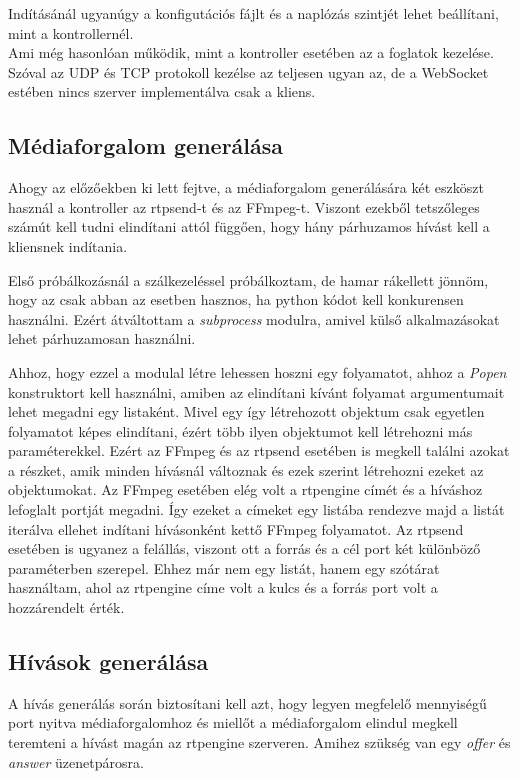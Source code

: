 Indításánál ugyanúgy a konfigutációs fájlt és a naplózás szintjét lehet beállítani,
mint a kontrollernél. \\

Ami még hasonlóan működik, mint a kontroller esetében az a foglatok kezelése.
Szóval az UDP és TCP protokoll kezélse az teljesen ugyan az, de a WebSocket estében
nincs szerver implementálva csak a kliens. 

\subsection{Médiaforgalom generálása}

Ahogy az előzőekben ki lett fejtve, a médiaforgalom generálására két eszköszt 
használ a kontroller az rtpsend-t és az FFmpeg-t. Viszont ezekből tetszőleges
számút kell tudni elindítani attól függően, hogy hány párhuzamos hívást kell 
a kliensnek indítania.

Első próbálkozásnál a szálkezeléssel próbálkoztam, de hamar rákellett jönnöm,
hogy az csak abban az esetben hasznos, ha python kódot kell konkurensen 
használni. Ezért átváltottam a \textit{subprocess} modulra, amivel külső alkalmazásokat
lehet párhuzamosan használni.

Ahhoz, hogy ezzel a modulal létre lehessen hoszni egy folyamatot, ahhoz a \textit{Popen}
konstruktort kell használni, amiben az elindítani kívánt folyamat argumentumait lehet
megadni egy listaként. Mivel egy így létrehozott objektum csak egyetlen folyamatot 
képes elindítani, ézért több ilyen objektumot kell létrehozni más paraméterekkel. Ezért
az FFmpeg és az rtpsend esetében is megkell találni azokat a részket, amik minden 
hívásnál változnak és ezek szerint létrehozni ezeket az objektumokat. Az FFmpeg esetében
elég volt a rtpengine címét és a híváshoz lefoglalt portját megadni. Így ezeket a címeket
egy listába rendezve majd a listát iterálva ellehet indítani hívásonként kettő
FFmpeg folyamatot. Az rtpsend esetében is ugyanez a felállás, viszont ott a forrás és 
a cél port két különböző paraméterben szerepel. Ehhez már nem egy listát, hanem egy 
szótárat használtam, ahol az rtpengine címe volt a kulcs és a forrás port volt a hozzárendelt
érték.

\subsection{Hívások generálása}

A hívás generálás során biztosítani kell azt, hogy legyen megfelelő mennyiségű port
nyitva médiaforgalomhoz és miellőt a médiaforgalom elindul megkell teremteni a hívást
magán az rtpengine szerveren. Amihez szükség van egy \textit{offer} és \textit{answer}
üzenetpárosra.

